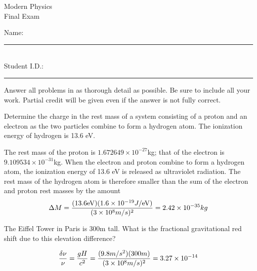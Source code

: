 \documentclass[10pt, onekey]{examdesign}
\def\eV{\mbox{eV}}
\begin{document}
\begin{frontmatter}
\vspace*{3in}
\begin{center}
  \huge Modern Physics \\[6pt]
  \Large Final Exam
\end{center}
\vfill
\begin{flushright}
  Name: \rule{3in}{.4pt} \\[10pt]
  Student I.D.: \rule{3in}{.4pt}
\end{flushright}
\end{frontmatter}

\begin{examtop}
\end{examtop}

\begin{shortanswer}[title={\Large Short Answer (10 pts each)},suppressprefix]
Answer all problems in as thorough detail as possible. Be sure to include all
your work. Partial credit will be given even if the answer is not fully correct.

\begin{question}
  Determine the charge in the rest mass of a system consisting of a proton
  and an electron as the two particles combine to form a hydrogen atom. The
  ionization energy of hydrogen is 13.6 eV.
  \examvspace*{1.5in}
  \begin{answer}
    The rest mass of the proton is $1.672649 \times 10^{-27}$kg; that of the
    electron is $9.109534 \times 10^{-31}$kg. When the electron and proton
    combine to form a hydrogen atom, the ionization energy of 13.6 eV is
    released as ultraviolet radiation. The rest mass of the hydrogen atom is
    therefore smaller than the sum of the electron and proton rest masses by
    the amount
    \[
    \Delta M = {(13.6 \eV)(1.6 \times 10^{-19} J/\eV) \over (3 \times 10^8 m/s)^2}
             = 2.42 \times 10^{-35}kg
    \]
  \end{answer}
\end{question}

\begin{question}
  The Eiffel Tower in Paris is 300m tall. What is the fractional gravitational
  red shift due to this elevation difference?
  \examvspace*{1in}
  \begin{answer}
    \[
    {\delta\nu \over \nu} = {gH \over c^2} = {(9.8m/s^2)(300m) \over
                            (3 \times 10^8 m/s)^2} = 3.27\times 10^{-14}
    \]
  \end{answer}
\end{question}


\end{shortanswer}
\end{document}
